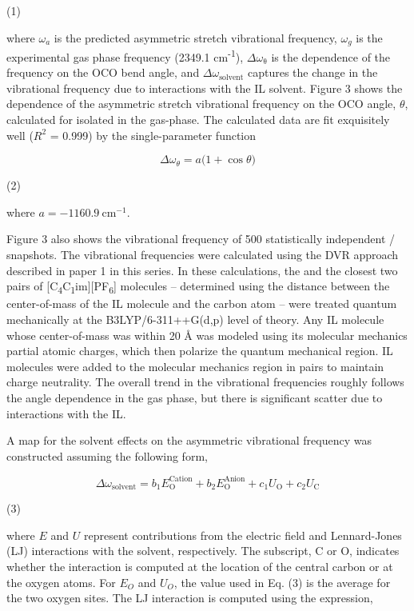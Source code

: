 \documentclass[]{article}
\begin{document}
(1)

where \(\omega_{a}\) is the predicted  asymmetric stretch vibrational frequency, \(\omega_{g}\) is the experimental gas phase frequency (2349.1 cm\textsuperscript{-1}), \(\Delta\omega_{\mathrm{\theta}}\) is the dependence of the frequency on the OCO bend angle, and \(\Delta\omega_{\mathrm{\text{solvent}}}\) captures the change in the vibrational frequency due to interactions with the IL solvent. Figure 3 shows the dependence of the  asymmetric stretch vibrational frequency on the OCO angle, \(\theta\), calculated for  isolated in the gas-phase.  The calculated data are fit exquisitely well (\(R^{2}\) = 0.999) by the single-parameter function

\[\Delta\omega_{\theta} = a(1 + \cos{\theta)}\]

(2)

where \(a = - 1160.9\ \mathrm{c}\mathrm{m}^{\mathrm{- 1}}.\)

Figure 3 also shows the vibrational frequency of 500 statistically independent /\ce{[C4C1im][PF6]} snapshots. The vibrational frequencies were calculated using the DVR approach described in paper 1 in this series. In these calculations, the  and the closest two pairs of {[}C­\textsubscript{4}C\textsubscript{1}im{]}{[}PF\textsubscript{6}{]} molecules -- determined using the distance between the center-of-mass of the IL molecule and the  carbon atom -- were treated quantum mechanically at the B3LYP/6-311++G(d,p) level of theory. Any IL molecule whose center-of-mass was within 20 Å was modeled using its molecular mechanics partial atomic charges, which then polarize the quantum mechanical region. IL molecules were added to the molecular mechanics region in pairs to maintain charge neutrality. The overall trend in the vibrational frequencies roughly follows the angle dependence in the gas phase, but there is significant scatter due to interactions with the IL.

A map for the solvent effects on the asymmetric  vibrational frequency was constructed assuming the following form,

\[\Delta\omega_{\mathrm{\text{solvent}}} = b_{1}E_{\mathrm{O}}^{\text{Cation}} + b_{2}E_{\mathrm{O}}^{\text{Anion}} + c_{1}U_{\mathrm{O}} + c_{2}U_{\mathrm{C}}\]

(3)

where \(E\) and \(U\) represent contributions from the electric field and Lennard-Jones (LJ) interactions with the solvent, respectively. The subscript, C or O, indicates whether the interaction is computed at the location of the  central carbon or at the oxygen atoms. For \(E_{O}\) and \(U_{O}\), the value used in Eq. (3) is the average for the two  oxygen sites. The LJ interaction is computed using the expression,
\end{document}
